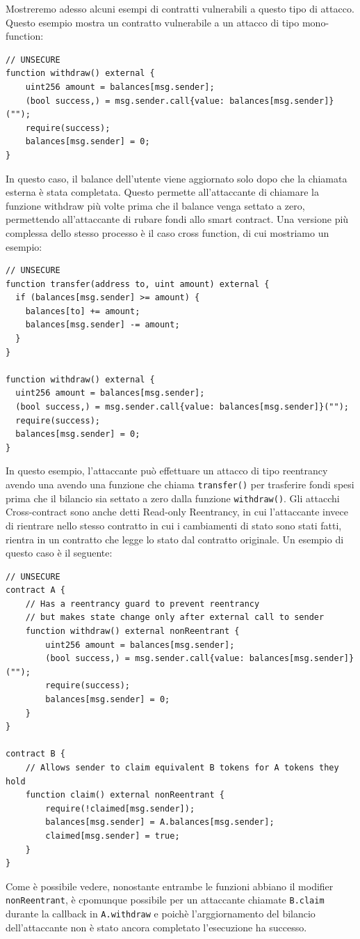 \documentclass[../../Thesis.tex]{subfiles}
\begin{document}
Mostreremo adesso alcuni esempi di contratti vulnerabili a questo tipo di attacco. Questo esempio mostra un contratto vulnerabile a un attacco di tipo mono-function: 
\begin{lstlisting}[language=Solidity]
// UNSECURE
function withdraw() external {
    uint256 amount = balances[msg.sender];
    (bool success,) = msg.sender.call{value: balances[msg.sender]}("");
    require(success);
    balances[msg.sender] = 0;
}
\end{lstlisting}
In questo caso, il balance dell'utente viene aggiornato solo dopo che la chiamata esterna è stata completata. Questo permette all'attaccante di chiamare la funzione withdraw più volte prima che il balance venga settato a zero, permettendo all'attaccante di rubare fondi allo smart contract.
Una versione più complessa dello stesso processo è il caso cross function, di cui mostriamo un esempio:
\begin{lstlisting}[language=Solidity]
    // UNSECURE
function transfer(address to, uint amount) external {
  if (balances[msg.sender] >= amount) {
    balances[to] += amount;
    balances[msg.sender] -= amount;
  }
}

function withdraw() external {
  uint256 amount = balances[msg.sender];
  (bool success,) = msg.sender.call{value: balances[msg.sender]}("");
  require(success);
  balances[msg.sender] = 0;
}
\end{lstlisting}
In questo esempio, l'attaccante può effettuare un attacco di tipo reentrancy avendo una avendo una funzione che chiama \texttt{transfer()} per trasferire fondi spesi prima che il bilancio sia settato a zero dalla funzione \texttt{withdraw()}.
Gli attacchi Cross-contract sono anche detti Read-only Reentrancy, in cui l'attaccante invece di rientrare nello stesso contratto in cui i cambiamenti di stato sono stati fatti, rientra in un contratto che legge lo stato dal contratto originale. Un esempio di questo caso è il seguente:
\begin{lstlisting}[language=Solidity]
    // UNSECURE
contract A {
	// Has a reentrancy guard to prevent reentrancy
	// but makes state change only after external call to sender
	function withdraw() external nonReentrant {
		uint256 amount = balances[msg.sender];
		(bool success,) = msg.sender.call{value: balances[msg.sender]}("");
		require(success);
		balances[msg.sender] = 0;
	}
}

contract B {
	// Allows sender to claim equivalent B tokens for A tokens they hold
	function claim() external nonReentrant {
		require(!claimed[msg.sender]);
		balances[msg.sender] = A.balances[msg.sender];
		claimed[msg.sender] = true;
	}
}
\end{lstlisting}
Come è possibile vedere, nonostante entrambe le funzioni abbiano il modifier \texttt{nonReentrant}, è cpomunque possibile per un attaccante chiamate \texttt{B.claim} durante la callback in \texttt{A.withdraw} e poichè l'arggiornamento del bilancio dell'attaccante non è stato ancora completato l'esecuzione ha successo.
\end{document}
